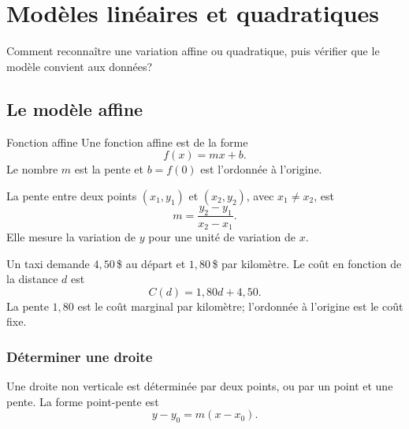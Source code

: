 \chapter{Modèles linéaires et quadratiques}
\label{manual:chapter:04}

\begin{questionbox}
Comment reconnaître une variation affine ou quadratique, puis vérifier que le modèle convient aux données?
\end{questionbox}

\section{Le modèle affine}
\label{manual:section:04.01}

\begin{definition}{Fonction affine}{}
Une fonction affine est de la forme
\[
f(x)=mx+b.
\]
Le nombre $m$ est la pente et $b=f(0)$ est l'ordonnée à l'origine.
\end{definition}

La pente entre deux points $(x_1,y_1)$ et $(x_2,y_2)$, avec $x_1\neq x_2$, est
\[
m=\frac{y_2-y_1}{x_2-x_1}.
\]
Elle mesure la variation de $y$ pour une unité de variation de $x$.

\begin{center}
\end{center}

\begin{examplebox}
Un taxi demande $4{,}50\,$\$ au départ et $1{,}80\,$\$ par kilomètre. Le coût en fonction de la distance $d$ est
\[
C(d)=1{,}80d+4{,}50.
\]
La pente $1{,}80$ est le coût marginal par kilomètre; l'ordonnée à l'origine est le coût fixe.
\end{examplebox}

\subsection{Déterminer une droite}

Une droite non verticale est déterminée par deux points, ou par un point et une pente. La forme point-pente est
\[
y-y_0=m(x-x_0).
\]


